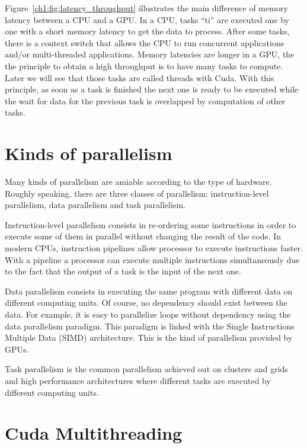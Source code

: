 Figure~\ref{ch1:fig:latency_throughput}  illustrates   the  main  difference  of
memory latency between a CPU and a  GPU. In a CPU, tasks ``ti'' are executed one
by one with a short memory latency to get the data to process. After some tasks,
there is  a context switch  that allows the  CPU to run  concurrent applications
and/or multi-threaded  applications. Memory latencies  are longer in a  GPU, the
the  principle  to   obtain  a  high  throughput  is  to   have  many  tasks  to
compute. Later we  will see that those tasks are called  threads with Cuda. With
this  principle, as soon  as a  task is  finished the  next one  is ready  to be
executed  while the  wait for  data for  the previous  task is  overlapped by
computation of other tasks.



\section{Kinds of parallelism}

Many  kinds  of parallelism  are  amiable according  to  the  type of  hardware.
Roughly  speaking, there  are three  classes of  parallelism: instruction-level
parallelism, data parallelism and task parallelism.

Instruction-level parallelism consists in re-ordering some instructions in order
to execute  some of them in parallel  without changing the result  of the code.
In  modern CPUs, instruction  pipelines allow  processor to  execute instructions
faster.   With   a  pipeline  a  processor  can   execute  multiple  instructions
simultaneously due  to the fact that  the output of a  task is the  input of the
next one.

Data parallelism consists  in executing the same program  with different data on
different computing  units.  Of course,  no dependency should exist  between the
data. For example, it is easy  to parallelize loops without dependency using the
data parallelism paradigm. This paradigm  is linked with the Single Instructions
Multiple Data (SIMD)  architecture. This is the kind  of parallelism provided by
GPUs.

Task parallelism is the common parallelism  achieved out on clusters and grids and
high performance  architectures where different tasks are  executed by different
computing units.

\section{Cuda Multithreading}

